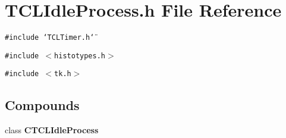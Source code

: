 \section{TCLIdle\-Process.h File Reference}
\label{TCLIdleProcess_8h}
{\tt \#include \char`\"{}TCLTimer.h\char`\"{}}\par
{\tt \#include $<$histotypes.h$>$}\par
{\tt \#include $<$tk.h$>$}\par
\subsection*{Compounds}
\begin{CompactItemize}
\item 
class {\bf CTCLIdle\-Process}
\end{CompactItemize}
